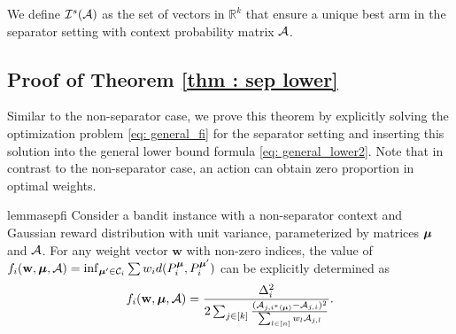 We define $\mathcal{I}^s(\mathcal{A})$ as the set of vectors in $\mathbb{R}^k$ that ensure a unique best arm in the separator setting with context probability matrix $\mathcal{A}$.



\subsection{Proof of Theorem \ref{thm : sep lower}}
    
Similar to the non-separator case, we prove this theorem by explicitly solving the optimization problem \eqref{eq: general_fi} for the separator setting and inserting this solution into the general lower bound formula \eqref{eq: general_lower2}. Note that in contrast to the non-separator case, an action can obtain zero proportion in optimal weights.

\begin{restatable}{lemma}{sepfi}\label{lem: sepfi}
            Consider a bandit instance with a non-separator context and Gaussian reward distribution with unit variance, parameterized by matrices $\boldsymbol{\mu}$ and $\mathcal{A}$. For any weight vector $\mathbf{w}$ with non-zero indices, the value of $f_i(\mathbf{w}, \boldsymbol{\mu}, \mathcal{A}) = \inf_{\boldsymbol{\mu}' \in \mathcal{C}_i} \sum w_i d(P^{\boldsymbol{\mu}}_{i}, P^{\boldsymbol{\mu}'}_{i})$ can be explicitly determined as
            \begin{align*}
                f_i(\mathbf{w}, \boldsymbol{\mu}, \mathcal{A}) = \frac{\Delta_{i}^2}{2 \sum_{j \in [k]} \frac{(\mathcal{A}_{j, i^*(\boldsymbol{\mu})} - \mathcal{A}_{j, i})^2}{\sum_{l \in [n]}w_{l}\mathcal{A}_{j,l}}}.  
            \end{align*}
\end{restatable}

